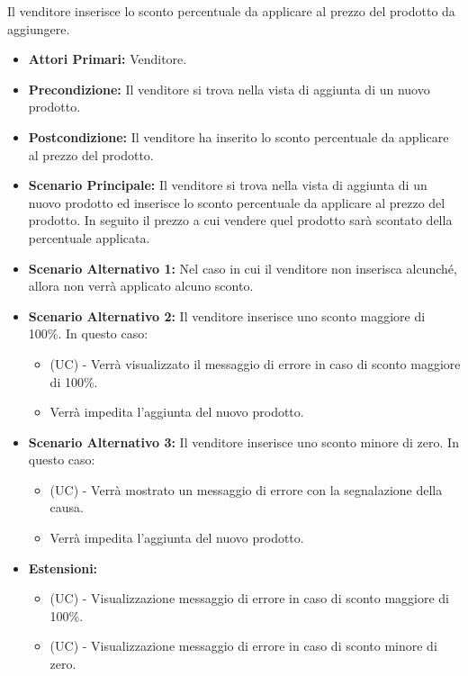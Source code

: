 Il venditore inserisce lo sconto percentuale da applicare al prezzo del prodotto da aggiungere.
\begin{itemize}
    \item \textbf{Attori Primari:} Venditore.
    \item \textbf{Precondizione:} Il venditore si trova nella vista di aggiunta di un nuovo prodotto.
    \item \textbf{Postcondizione:} Il venditore ha inserito lo sconto percentuale da applicare al prezzo del prodotto.
    \item \textbf{Scenario Principale:} Il venditore si trova nella vista di aggiunta di un nuovo prodotto ed inserisce lo sconto percentuale da applicare al prezzo del prodotto. In seguito il prezzo a cui vendere quel prodotto sarà scontato della percentuale applicata.
    \item \textbf{Scenario Alternativo 1:} Nel caso in cui il venditore non inserisca alcunché, allora non verrà applicato alcuno sconto.
    \item \textbf{Scenario Alternativo 2:} Il venditore inserisce uno sconto maggiore di 100\%. In questo caso:
    \begin{itemize}
        \item (UC) - Verrà visualizzato il messaggio di errore in caso di sconto maggiore di 100\%.
        \item Verrà impedita l'aggiunta del nuovo prodotto.
    \end{itemize}
    \item \textbf{Scenario Alternativo 3:} Il venditore inserisce uno sconto minore di zero. In questo caso:
    \begin{itemize}
        \item (UC) - Verrà mostrato un messaggio di errore con la segnalazione della causa.
        \item Verrà impedita l'aggiunta del nuovo prodotto.
    \end{itemize}
    \item \textbf{Estensioni:}
    \begin{itemize}
        \item (UC) - Visualizzazione messaggio di errore in caso di sconto maggiore di 100\%.
        \item (UC) - Visualizzazione messaggio di errore in caso di sconto minore di zero.
    \end{itemize}
\end{itemize}

